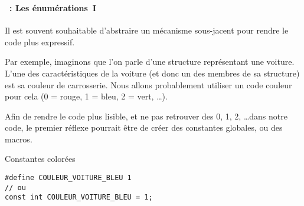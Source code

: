 \begin{frame}[containsverbatim]
  \frametitle{\secname}
  \framesubtitle{\subsecname~: Les énumérations~I} 

  Il est souvent souhaitable d'abstraire un mécanisme sous-jacent pour rendre le code plus expressif.
  \vspace{0.3cm}
  \par
  Par exemple, imaginons que l'on parle d'une structure représentant une voiture. L'une des caractéristiques
  de la voiture (et donc un des membres de sa structure) est sa couleur de carrosserie. Nous allons probablement
  utiliser un code couleur pour cela (0 = rouge, 1 = bleu, 2 = vert, \ldots).
  \vspace{0.3cm}
  \par
  Afin de rendre le code plus lisible, et ne pas retrouver des 0, 1, 2, \ldots dans notre code, le premier réflexe
  pourrait être de créer des constantes globales, ou des macros.
  \begin{exampleblock}{Constantes colorées}
    \begin{verbatim}    
#define COULEUR_VOITURE_BLEU 1 
// ou 
const int COULEUR_VOITURE_BLEU = 1;\end{verbatim}
  \end{exampleblock}
\end{frame}


